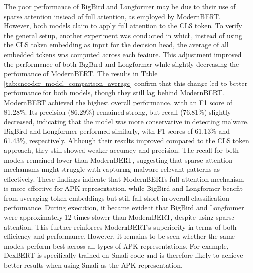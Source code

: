The poor performance of BigBird and Longformer may be due to their use of sparse 
attention instead of full attention, as employed by ModernBERT. 
However, both models claim to apply full attention to the CLS token. 
To verify the general setup, another experiment was conducted in which, 
instead of using the CLS token embedding as input for the decision head, 
the average of all embedded tokens was computed across each feature. 
This adjustment improved the performance of both BigBird and Longformer 
while slightly decreasing the performance of ModernBERT. 
The results in Table \ref{tab:encoder_model_comparison_average} 
confirm that this change led to better performance for both models, though they still lag behind ModernBERT.
ModernBERT achieved the highest overall performance, with an F1 score of 81.28\%.
Its precision (86.29\%) remained strong, but recall (76.81\%) slightly decreased, 
indicating that the model was more conservative in detecting malware.
BigBird and Longformer performed similarly, with F1 scores of 61.13\% and 61.43\%, respectively.
Although their results improved compared to the CLS token approach, they still showed weaker accuracy and precision.
The recall for both models remained lower than ModernBERT, 
suggesting that sparse attention mechanisms might struggle with capturing malware-relevant patterns as effectively.
These findings indicate that ModernBERTs full attention mechanism is more effective for APK representation, 
while BigBird and Longformer benefit from averaging token embeddings but still fall short in overall classification performance.
During execution, it became evident that BigBird and Longformer were approximately 12 times slower than ModernBERT, 
despite using sparse attention.
This further reinforces ModernBERT’s superiority in terms of both efficiency and performance.
However, it remains to be seen whether the same models perform best across all types of APK representations.
For example, DexBERT is specifically trained on Smali code and is therefore likely to achieve better results when using 
Smali as the APK representation.

\begin{table}[b] 
    \caption{\label{tab:encoder_model_comparison_cls}%
    Performance comparison of different encoder models for generating embeddings. The APK representation is fixed to Activities (A) and Permissions (P). The encoder was trained through backpropagation in this experiment. The transcenden subset was used as dataset. The embedding of the CLS token was used as APK embedding.}    
\end{table}

